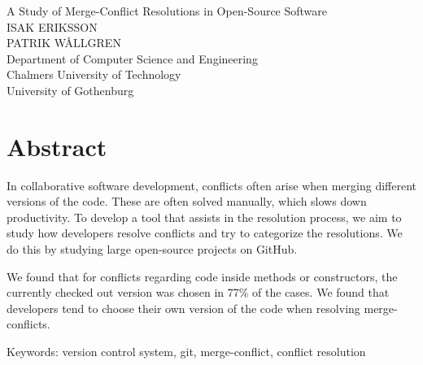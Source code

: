 A Study of Merge-Conflict Resolutions in Open-Source Software\\

ISAK ERIKSSON\\
PATRIK WÅLLGREN\\
Department of Computer Science and Engineering\\
Chalmers University of Technology\\
University of Gothenburg \setlength{\parskip}{0.5cm}

\thispagestyle{plain}			%
\section*{Abstract}
In collaborative software development, conflicts often arise when merging different versions of the code. These are often solved manually, which slows down productivity. To develop a tool that assists in the resolution process, we aim to study how developers resolve conflicts and try to categorize the resolutions. We do this by studying large open-source projects on GitHub.

We found that for conflicts regarding code inside methods or constructors, the currently checked out version was chosen in 77\% of the cases. We found that developers tend to choose their own version of the code when resolving merge-conflicts.

Keywords: version control system, git, merge-conflict, conflict resolution

\newpage				%
\thispagestyle{empty}
\mbox{}


